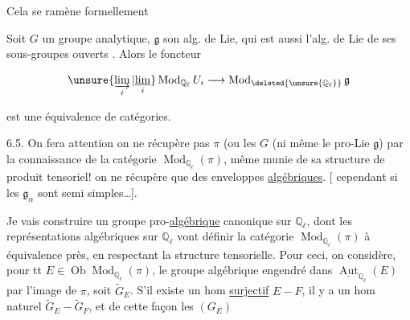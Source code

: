 Cela se ramène formellement  

\uline{} Soit $G$ un groupe analytique, $\mathfrak g$ son alg. de Lie, qui est aussi l'alg. de Lie de ses sous-groupes ouverts . Alors le foncteur

\[
\unsure{\varinjlim_i|\underset{i}{\underline{\lim}}}\operatorname{Mod}_{\mathbb Q_\ell}U_i\longrightarrow\operatorname{Mod}_{\deleted{\unsure{\mathbb Q_\ell}}}\mathfrak g
\]

est une équivalence de catégories.

6.5. On fera attention  on ne récupère pas $\pi$ (ou les  $G$  (ni même le pro-Lie $\mathfrak g$) par la connaissance de la catégorie $\operatorname{Mod}_{\mathbb Q_\ell}(\pi)$, même munie de sa structure de produit tensoriel! on ne récupère que des enveloppes \uline{algébriques}. [ cependant si  les $\mathfrak g_\alpha$ sont semi simples\ldots].


 Je vais construire un groupe pro-\uline{algébrique}  canonique  sur \textcircled{$\mathbb Q_\ell$}, dont les représentations algébriques sur \deleted{$\unsure{\pi}$} $\mathbb Q_\ell$ vont définir la catégorie $\operatorname{Mod}_{\mathbb Q_\ell}(\pi)$ à équivalence près, en respectant la structure tensorielle. Pour ceci, on considère, pour tt $E\in\operatorname{Ob}\operatorname{Mod}_{\mathbb Q_\ell}(\pi)$, le groupe algébrique engendré dans $\underline{\operatorname{Aut}}_{\mathbb Q_\ell}(E)$ par l'image de $\pi$, soit $\widetilde G_E$. S'il existe un hom \uline{surjectif} $E\mathbin{-}F$, il y a un hom naturel $\widetilde G_E\mathbin{-}\widetilde G_F$, et de cette façon les $(G_E)$
